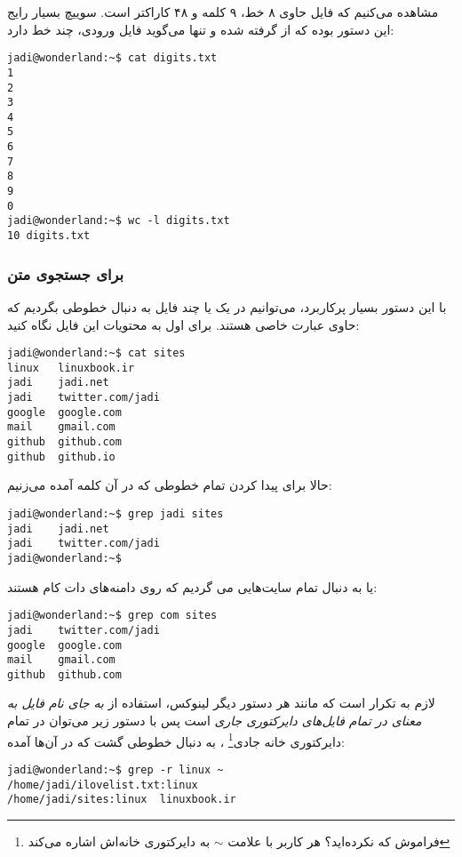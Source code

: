مشاهده می‌کنیم که فایل 
 حاوی ۸ خط، ۹ کلمه و ۴۸ کاراکتر است. سوییچ بسیار رایج این دستور
 بوده که از 
 گرفته شده و تنها می‌گوید فایل ورودی، چند خط دارد:
\begin{frameng}
\begin{lstlisting}
jadi@wonderland:~$ cat digits.txt 
1
2
3
4
5
6
7
8
9
0
jadi@wonderland:~$ wc -l digits.txt 
10 digits.txt
\end{lstlisting}
\end{frameng}

\subsubsection*{ برای جستجوی متن}
با این دستور بسیار پرکاربرد، می‌توانیم در یک یا چند فایل به دنبال خطوطی بگردیم که حاوی عبارت خاصی هستند. برای اول به محتویات این فایل نگاه کنید:
\begin{frameng}
\begin{lstlisting}
jadi@wonderland:~$ cat sites 
linux   linuxbook.ir
jadi    jadi.net
jadi    twitter.com/jadi
google  google.com
mail    gmail.com
github  github.com
github  github.io
\end{lstlisting}
\end{frameng}

حالا برای پیدا کردن تمام خطوطی که در آن کلمه 
 آمده می‌زنیم:
\begin{frameng}
\begin{lstlisting}
jadi@wonderland:~$ grep jadi sites 
jadi    jadi.net
jadi    twitter.com/jadi
jadi@wonderland:~$ 
\end{lstlisting}
\end{frameng}

یا به دنبال تمام سایت‌هایی می گردیم که روی دامنه‌های دات کام هستند:
\begin{frameng}
\begin{lstlisting}
jadi@wonderland:~$ grep com sites 
jadi    twitter.com/jadi
google  google.com
mail    gmail.com
github  github.com
\end{lstlisting}
\end{frameng}

لازم به تکرار است که مانند هر دستور دیگر لینوکس، استفاده از
\emph{ به جای نام فایل به معنای در تمام فایل‌های دایرکتوری جاری}
است پس با دستور زیر می‌توان در تمام
دایرکتوری خانه جادی\footnote{فراموش که نکرده‌اید؟ هر کاربر با علامت $\sim$ به دایرکتوری خانه‌اش اشاره می‌کند}
، به دنبال خطوطی گشت که 
 در آن‌ها آمده:
\begin{frameng}
\begin{lstlisting}
jadi@wonderland:~$ grep -r linux ~
/home/jadi/ilovelist.txt:linux
/home/jadi/sites:linux  linuxbook.ir
\end{lstlisting}
\end{frameng}

